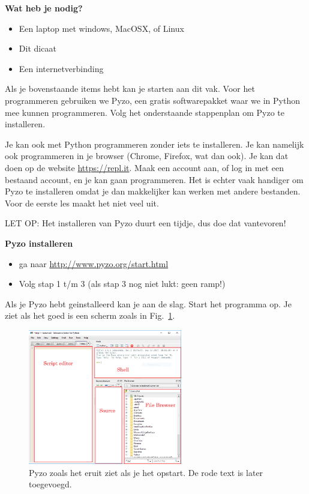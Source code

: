 \textbf{Wat heb je nodig?}
\begin{itemize}
\item Een laptop met windows, MacOSX, of Linux
\item Dit dicaat
\item Een internetverbinding
\end{itemize}

Als je bovenstaande items hebt kan je starten aan dit vak. Voor het programmeren gebruiken we Pyzo, een gratis softwarepakket waar we in Python mee kunnen programmeren. Volg het onderstaande stappenplan om Pyzo te installeren.

Je kan ook met Python programmeren zonder iets te installeren. Je kan namelijk ook programmeren in je browser (Chrome, Firefox, wat dan ook). Je kan dat doen op de website \href{https://repl.it}{https://repl.it}. Maak een account aan, of log in met een bestaand account, en je kan gaan programmeren. Het is echter vaak handiger om Pyzo te installeren omdat je dan makkelijker kan werken met andere bestanden. Voor de eerste les maakt het niet veel uit.

LET OP: Het installeren van Pyzo duurt een tijdje, dus doe dat vantevoren! 

\textbf{Pyzo installeren}
\begin{itemize}
\item ga naar \href{http://www.pyzo.org/start.html}{http://www.pyzo.org/start.html}
\item Volg stap 1 t/m 3 (als stap 3 nog niet lukt: geen ramp!)
\end{itemize}

Als je Pyzo hebt geinstalleerd kan je aan de slag. Start het programma op. Je ziet als het goed is een scherm zoals in Fig.~\ref{fig:pyzokaal}.

\begin{figure}[h]
\begin{center}
\includegraphics[width=0.6\textwidth]{img/pyzokaal.PNG}
\caption{\label{fig:pyzokaal} Pyzo zoals het eruit ziet als je het opstart. De rode text is later toegevoegd. }
\end{center}
\end{figure}

